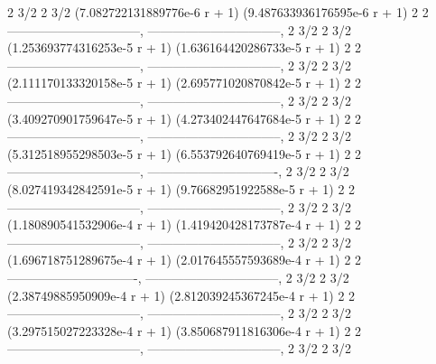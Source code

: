 \documentclass[a4paper,10pt]{article}
\begin{document}
\begin{eulernotebook}
\begin{euleroutput}
                         2     3/2                         2     3/2
  (7.082722131889776e-6 r  + 1)     (9.487633936176595e-6 r  + 1)
                 2                                 2
  --------------------------------, --------------------------------, 
                         2     3/2                         2     3/2
  (1.253693774316253e-5 r  + 1)     (1.636164420286733e-5 r  + 1)
                 2                                 2
  --------------------------------, --------------------------------, 
                         2     3/2                         2     3/2
  (2.111170133320158e-5 r  + 1)     (2.695771020870842e-5 r  + 1)
                 2                                 2
  --------------------------------, --------------------------------, 
                         2     3/2                         2     3/2
  (3.409270901759647e-5 r  + 1)     (4.273402447647684e-5 r  + 1)
                 2                                 2
  --------------------------------, --------------------------------, 
                         2     3/2                         2     3/2
  (5.312518955298503e-5 r  + 1)     (6.553792640769419e-5 r  + 1)
                 2                                 2
  --------------------------------, -------------------------------, 
                         2     3/2                        2     3/2
  (8.027419342842591e-5 r  + 1)     (9.76682951922588e-5 r  + 1)
                 2                                 2
  --------------------------------, --------------------------------, 
                         2     3/2                         2     3/2
  (1.180890541532906e-4 r  + 1)     (1.419420428173787e-4 r  + 1)
                 2                                 2
  --------------------------------, --------------------------------, 
                         2     3/2                         2     3/2
  (1.696718751289675e-4 r  + 1)     (2.017645557593689e-4 r  + 1)
                 2                                2
  -------------------------------, --------------------------------, 
                        2     3/2                         2     3/2
  (2.38749885950909e-4 r  + 1)     (2.812039245367245e-4 r  + 1)
                 2                                 2
  --------------------------------, --------------------------------, 
                         2     3/2                         2     3/2
  (3.297515027223328e-4 r  + 1)     (3.850687911816306e-4 r  + 1)
                 2                                 2
  --------------------------------, --------------------------------, 
                         2     3/2                         2     3/2

\end{euleroutput}
\end{eulernotebook}
\end{document}
